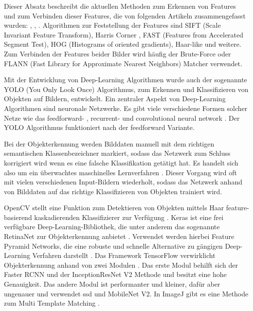 Dieser Absatz beschreibt die aktuellen Methoden zum Erkennen von Features und zum Verbinden dieser Features, die von folgenden Artikeln zusammengefasst wurden: \cite{FeatureMatchingOnline}, \cite{ObjectDetectionReview}, \cite{FeaturesReview}.
Algorithmen zur Feststellung der Features sind SIFT \cite{FeatureMatchingSIFT} (Scale Invariant Feature Transform), Harris Corner \cite{FeatureMatchingHarrisCorner}, FAST \cite{FeatureMatchingFAST} (Features from Accelerated Segment Test), HOG \cite{FeaturesHOG} (Histograms of oriented gradients), Haar-like \cite{FeaturesHaarLike} und weitere.
Zum Verbinden der Features beider Bilder wird häufig der Brute-Force \cite{FeatureMatchingBruteForce} oder FLANN \cite{FeatureMatchingFLANN} (Fast Library for Approximate Nearest Neighbors) Matcher verwendet. \par
Mit der Entwicklung von Deep-Learning Algorithmen wurde auch der sogenannte YOLO \cite{YOLOOfficialPub} (You Only Look Once) Algorithmus, zum Erkennen und Klassifizieren von Objekten auf Bildern, entwickelt. Ein zentraler Aspekt von Deep-Learning Algorithmen sind neuronale Netzwerke. Es gibt viele verschiedene Formen solcher Netze wie das feedforward- \cite{FeedForwardElsevier}, recurrent- \cite{RecurrentNeuralNetworks} und convolutional \cite{ConvolutionalNeuralNetworks} neural network \cite{NeuralNetwork}. Der YOLO Algorithmus funktioniert nach der feedforward Variante. \par
Bei der Objekterkennung werden Bilddaten manuell mit dem richtigen semantischen Klassenbezeichner markiert, sodass das Netzwerk zum Schluss korrigiert wird wenn es eine falsche Klassifikation getätigt hat. Es handelt sich also um ein überwachtes maschinelles Lernverfahren \cite{SupervisedMachineLearning}. Dieser Vorgang wird oft mit vielen verschiedenen Input-Bildern wiederholt, sodass das Netzwerk anhand von Bilddaten auf das richtige Klassifizieren von Objekten trainiert wird. \par
OpenCV stellt eine Funktion zum Detektieren von Objekten mittels Haar feature-basierend kaskadierenden Klassifizierer zur Verfügung \cite{OpenCVHaarLike}. Keras ist eine frei verfügbare Deep-Learning-Bibliothek, die unter anderem das sogenannte RetinaNet zur Objekterkennung anbietet \cite{KerasRetinaNet}. Verwendet werden hierbei Feature Pyramid Networks, die eine robuste und schnelle Alternative zu gängigen Deep-Learning Verfahren darstellt \cite{KerasPyramidNet}. Das Framework TensorFlow verwirklicht Objekterkennung anhand von zwei Modulen \cite{TensorFlowObj}. Das erste Modul behilft sich der Faster RCNN und der InceptionResNet V2 Methode und besitzt eine hohe Genauigkeit. Das andere Modul ist performanter und kleiner, dafür aber ungenauer und verwendet ssd und MobileNet V2. In ImageJ gibt es eine Methode zum Multi Template Matching \cite{ImageJ}.

